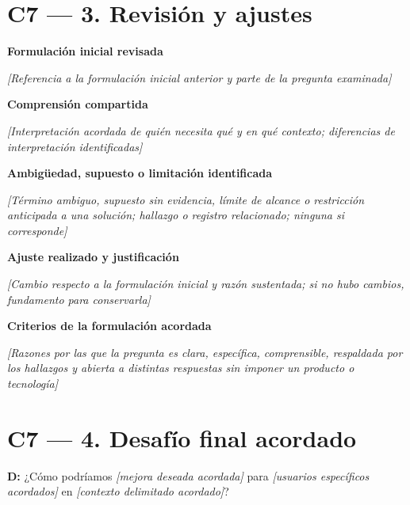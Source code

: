 \documentclass[12pt,a4paper]{article}
\newcommand{\campo}[1]{\textcolor{InstructionColor}{\textit{[#1]}}}
\newcommand{\concept}[1]{\textcolor{ConceptColor}{\textbf{#1}}}
\newcommand{\respuesta}[2]{\par\textbf{#1}\par\campo{#2}\par}
\newcounter{desafioCsiete}
\renewcommand{\thedesafioCsiete}{D\arabic{desafioCsiete}}
\begin{document}
\section*{C7 --- 3. Revisión y ajustes}
\respuesta{Formulación inicial revisada}{Referencia a la formulación inicial anterior y parte de la pregunta examinada}
\respuesta{Comprensión compartida}{Interpretación acordada de quién necesita qué y en qué contexto; diferencias de interpretación identificadas}
\respuesta{Ambigüedad, supuesto o limitación identificada}{Término ambiguo, supuesto sin evidencia, límite de alcance o restricción anticipada a una solución; hallazgo o registro relacionado; ninguna si corresponde}
\respuesta{Ajuste realizado y justificación}{Cambio respecto a la formulación inicial y razón sustentada; si no hubo cambios, fundamento para conservarla}
\respuesta{Criterios de la formulación acordada}{Razones por las que la pregunta es clara, específica, comprensible, respaldada por los hallazgos y abierta a distintas respuestas sin imponer un producto o tecnología}

\section*{C7 --- 4. Desafío final acordado}
\label{desafio:C7:D1}
\concept{\thedesafioCsiete:} ¿Cómo podríamos \campo{mejora deseada acordada} para \campo{usuarios específicos acordados} en \campo{contexto delimitado acordado}?
\end{document}
